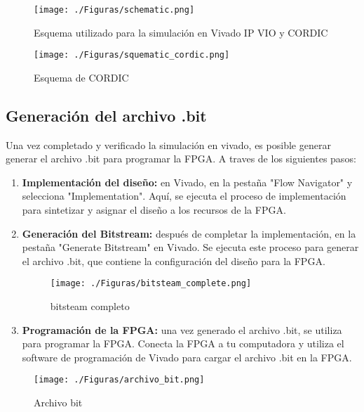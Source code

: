 \documentclass[12pt,a4paper, twoside]{article} %
\begin{document}
\begin{figure}[ht]
    \centering
    \texttt{[image: ./Figuras/schematic.png]}
    \caption{Esquema utilizado para la simulación en Vivado IP VIO y CORDIC}
    \label{fig:esquema}
\end{figure}

    
    
    \begin{figure}[ht]
    \centering
    \texttt{[image: ./Figuras/squematic\_cordic.png]}
    \caption{Esquema de CORDIC}
    \label{fig:esquema}
\end{figure}


\subsection{Generación del archivo .bit}

Una vez completado y verificado la simulación en vivado, es posible generar generar el archivo .bit para programar la FPGA. A traves de los siguientes pasos:

\begin{enumerate}
    \item \textbf{Implementación del diseño:} en Vivado, en la pestaña "Flow Navigator" y selecciona "Implementation". Aquí,  se ejecuta el proceso de implementación para sintetizar y asignar el diseño a los recursos de la FPGA.
    
    \item \textbf{Generación del Bitstream:} después de completar la implementación, en la pestaña "Generate Bitstream" en Vivado. Se ejecuta este proceso para generar el archivo .bit, que contiene la configuración del diseño para la FPGA.
    
    \begin{figure}[ht]
    \centering
    \texttt{[image: ./Figuras/bitsteam\_complete.png]}
    \caption{bitsteam completo}
    \label{fig:bitsteam_complete}
\end{figure}

    
    \item \textbf{Programación de la FPGA:} una vez generado el archivo .bit, se utiliza para programar la FPGA. Conecta la FPGA a tu computadora y utiliza el software de programación de Vivado para cargar el archivo .bit en la FPGA.
\end{enumerate}

    \begin{figure}[ht]
    \centering
    \texttt{[image: ./Figuras/archivo\_bit.png]}
    \caption{Archivo bit}
    \label{fig:archivo_bit}
\end{figure}
\end{document}
